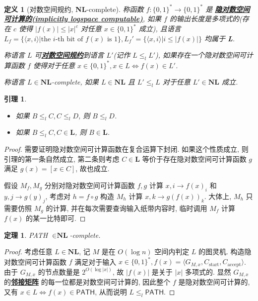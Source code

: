 \documentclass[8pt]{article}
\theoremstyle{compact}
\newtheorem{theorem}{定理}[section]
\newtheorem{lemma}{引理}[section]
\newtheorem{definition}{定义}[section]
\def\obj#1{\textbf{\uline{#1}}}
\def\le{\leqslant}
\def\L{\textbf{L}}
\def\NL{\textbf{NL}}
\begin{document}
\begin{definition}[对数空间规约, \NL-complete]
	称函数 $f: \{0, 1\}^* \to \{0, 1\}^*$ 是 \obj{隐对数空间可计算的(implicitly logspace computable)}, 如果 $f$ 的输出长度是多项式的(存在 $c$ 使得 $|f(x)| \le |x|^c$ 对任意 $x \in \{0, 1\}^*$ 成立), 且语言 $L_f = \{\langle x, i \rangle | \text{the } i \text{-th bit of } f(x) \text{ is } 1\}, L_f' = \{\langle x, i \rangle | i \le |f(x)|\}$ 均属于 \L.

	称语言 $L$ 可\obj{对数空间规约}到语言 $L'$(记作 $L \le_l L'$), 如果存在一个隐对数空间可计算函数 $f$ 使得对于任意 $x \in \{0, 1\}^*, x \in L \Leftrightarrow f(x) \in L'$.

	称语言 $L \in \NL$-complete, 如果 $L \in \NL$ 且 $L' \le_l L$ 对于任意 $L' \in \NL$ 成立.
	
	\label{def_logspace}
\end{definition}
\begin{lemma}
	\begin{itemize}
		\item 如果 $B \le_l C, C \le_l D$, 则 $B \le_l D$.
		\item 如果 $B \le_l C, C \in \L$, 则 $B \in \L$.
	\end{itemize}
\end{lemma}
\begin{proof}
	需要证明隐对数空间可计算函数在复合运算下封闭. 如果这个性质成立, 则引理的第一条自然成立, 第二条则考虑 $C \in \L$ 等价于存在隐对数空间可计算函数 $g$ 满足 $g(x) = [x \in C]$, 故也成立.

	假设 $M_f, M_g$ 分别对隐对数空间可计算函数 $f, g$ 计算 $x, i \to f(x)_i$ 和 $y, j \to g(y)_j$, 考虑对 $h = f \circ g$ 构造 $M_h$ 计算 $x, k \to g(f(x))_k$. 大体上, $M_h$ 只需要仿照 $M_g$ 的计算, 并在每次需要查询输入纸带内容时, 临时调用 $M_f$ 计算 $f(x)$ 的某一比特即可.

\end{proof}
\begin{theorem}
	\textsf{PATH} $\in \NL$-complete.
\end{theorem}
\begin{proof}
	考虑任意 $L \in \NL$, 记 $M$ 是在 $O(\log n)$ 空间内判定 $L$ 的图灵机. 构造隐对数空间可计算函数 $f$ 满足对于输入 $x \in \{0, 1\}^*, f(x) = \langle G_{M, x}, C_{\text{start}}, C_{\text{accept}} \rangle$. 由于 $G_{M, x}$ 的节点数量是 $2^{O(\log |x|)}$, 故 $|f(x)|$ 是关于 $|x|$ 多项式的. 显然 $G_{M, x}$ 的\obj{邻接矩阵} 的每一位都是对数空间可计算的, 因此整个 $f$ 是隐对数空间可计算的, 又有 $x \in L \Leftrightarrow f(x) \in \textsf{PATH}$, 从而说明 $L \le_l \textsf{PATH}$.
\end{proof}
\end{document}
